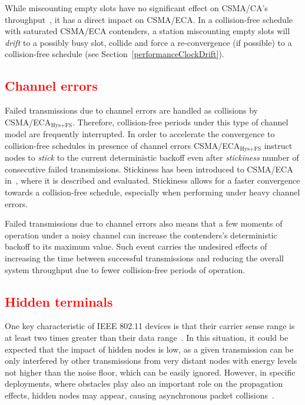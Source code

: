 	While miscounting empty slots have no significant effect on CSMA/CA's throughput~\cite{slotDrift}, it has a direct impact on CSMA/ECA. In a collision-free schedule with saturated CSMA/ECA contenders, a station miscounting empty slots will \emph{drift} to a possibly busy slot, collide and force a re-convergence (if possible) to a collision-free schedule (see Section~\ref{performanceClockDrift}).
	
%	

	\textcolor{red}{\subsection{Channel errors}}\label{errorEffect}
	Failed transmissions due to channel errors are handled as collisions by CSMA/ECA$_{\text{Hys+FS}}$. Therefore, collision-free periods under this type of channel model are frequently interrupted. In order to accelerate the convergence to collision-free schedules in presence of channel errors CSMA/ECA$_{\text{Hys+FS}}$ instruct nodes to \emph{stick} to the current deterministic backoff even after \emph{stickiness} number of consecutive failed transmissions. Stickiness has been introduced to CSMA/ECA in~\cite{barcelo2011tcf}, where it is described and evaluated. Stickiness allows for a faster convergence towards a collision-free schedule, especially when performing under heavy channel errors.
	
	Failed transmissions due to channel errors also means that a few moments of operation under a noisy channel can increase the contenders's deterministic backoff to its maximum value. Such event carries the undesired effects of increasing the time between successful transmissions and reducing the overall system throughput due to fewer collision-free periods of operation.
		
	\textcolor{red}{\subsection{Hidden terminals}}\label{hidden}
	One key characteristic of IEEE 802.11 devices is that their carrier sense range is at least two times greater than their data range~\cite{tuningCarrierSense}. In this situation, it could be expected that the impact of hidden nodes is low, as a given transmission can be only interfered by other transmissions from very distant nodes with energy levels not higher than the noise floor, which can be easily ignored. However, in specific deployments, where obstacles play also an important role on the propagation effects, hidden nodes may appear, causing asynchronous packet collisions~\cite{throughputUnderHiddenTerm}.
	
